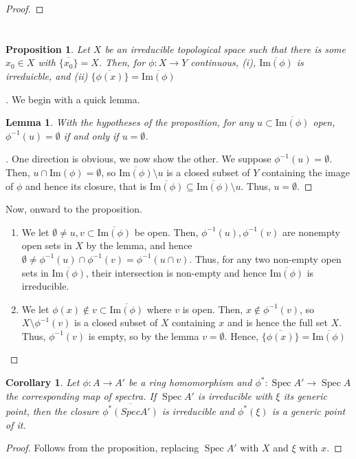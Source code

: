 \documentclass[english]{article}
\DeclareMathOperator{\spec}{Spec}
\newenvironment{subproof}[1][\proofname]{%
	\renewcommand{\qedsymbol}{$\blacksquare$}%
	\begin{proof}[#1]%
	}{%
	\end{proof}%
}
\newcommand{\prob}[1]{\setcounter{section}{#1-1}\section{}}
\newtheorem*{lemma*}{Lemma}
\newtheorem*{proposition*}{Proposition}
\newtheorem*{corollary*}{Corollary}
\theoremstyle{remark}
\theoremstyle{definition}
\newcommand{\cl}{\overline}
\newcommand{\im}{\mathrm{Im}}
\begin{document}
\begin{proof}
	\end{proof}

\prob{2}
\begin{proposition*}
	Let $X$ be an irreducible topological space such that there is some $x_0\in X$ with $\cl{\{x_0\}}=X$. Then, for $\phi:X\to Y$ continuous, \emph{(i)}, $\cl{\mathrm{Im}(\phi)}$ is irreduicble, and \emph{(ii)} $\cl{\{\phi(x)\}}=\cl{\mathrm{Im}(\phi)}$ 
\end{proposition*}
\begin{subproof}
	We begin with a quick lemma.
	\begin{lemma*}
		With the hypotheses of the proposition, for any $u\subset \cl{\im(\phi)}$ open, $\phi^{-1}(u)= \emptyset$ if and only if $u=\emptyset$.
	\end{lemma*}
\begin{subproof} One direction is obvious, we now show the other.
We suppose $\phi^{-1}(u)=\emptyset$. Then, $u\cap \im(\phi)=\emptyset$, so $\cl{\im(\phi)}\setminus u$ is a closed subset of $Y$ containing the image of $\phi$ and hence its closure, that is $\cl{\im(\phi)}\subseteq \cl{\im(\phi)}\setminus u$. Thus, $u=\emptyset$.
\end{subproof}
Now, onward to the proposition. \begin{enumerate}[label=\emph{(\roman*)}]
\item We let $\emptyset\neq u,v\subset \cl{\im(\phi)}$ be open. Then, $\phi^{-1}(u),\phi^{-1}(v)$ are nonempty open sets in $X$ by the lemma, and hence $\emptyset\neq \phi^{-1}(u)\cap \phi^{-1}(v)=\phi^{-1}(u\cap v)$. Thus, for any two non-empty open sets in $\cl{\im(\phi)}$, their intersection is non-empty and hence $\cl{\im(\phi)}$ is irreducible.
\item We let $\phi(x)\notin v\subset \cl{\im(\phi)}$ where $v$ is open. Then, $x\notin \phi^{-1}(v)$, so $X\setminus \phi^{-1}(v)$ is a closed subset of $X$ containing $x$ and is hence the full set $X$. Thus, $\phi^{-1}(v)$ is empty, so by the lemma $v=\emptyset$. Hence, $\cl{\{\phi(x)\}}=\cl{\im(\phi)}$
\end{enumerate}
\end{subproof}\begin{corollary*}
Let $\phi:A\to A'$ be a ring homomorphism and $\phi^*:\spec A'\to \spec A$ the corresponding map of spectra. If $\spec A'$
is irreducible with $\xi$ its generic point, then the closure $\cl{\phi^*(Spec A')}$ is irreducible and
 $\phi^*(\xi)$ is a generic point of it.
\end{corollary*}
\begin{proof}
	Follows from the proposition, replacing $\spec A'$ with $X$ and $\xi$ with $x$.

\end{proof}
\end{document}

